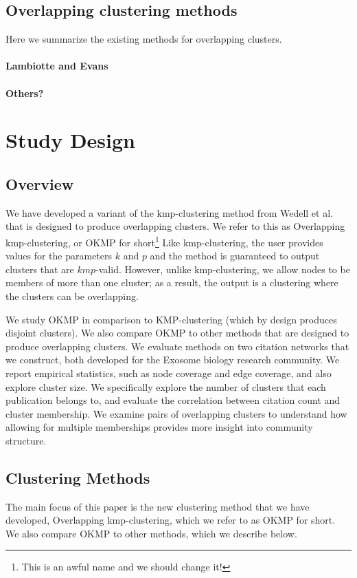 \documentclass{article}
\begin{document}
\subsection{Overlapping clustering methods}

Here we summarize the existing methods for overlapping clusters.

\paragraph{Lambiotte and Evans}

\paragraph{Others?}

\section{Study Design}
\subsection{Overview}
We have developed a variant of the kmp-clustering method from Wedell et al. \cite{Wedell2022} that is designed to produce overlapping
clusters.
We refer to this as Overlapping kmp-clustering, or OKMP for short\footnote{This is an awful name and we should change it!}
Like kmp-clustering, the user provides values for the parameters $k$ and $p$ and the method is guaranteed to output
clusters that are $kmp$-valid.
However, unlike kmp-clustering, we allow nodes to be members of more than one cluster; as a result, the output is a clustering where
the clusters can be overlapping.

We study OKMP  in comparison to KMP-clustering (which by design produces disjoint clusters). 
We also compare OKMP to  other methods that are designed to produce overlapping clusters.
We evaluate methods on two citation networks that we construct, both developed for the Exosome biology research community.
We report empirical statistics, such as node coverage and edge coverage, and also explore cluster size.
We specifically explore the number of clusters that each publication belongs to, and evaluate the correlation between
citation count and cluster membership.
We examine pairs of overlapping clusters to understand how allowing for multiple memberships provides more insight into community
structure.



\subsection{Clustering Methods}
The main focus of this paper is the new clustering method that we have developed, Overlapping kmp-clustering, which we refer to as OKMP for short.
We also compare OKMP to other methods, which we describe below.
\end{document}
